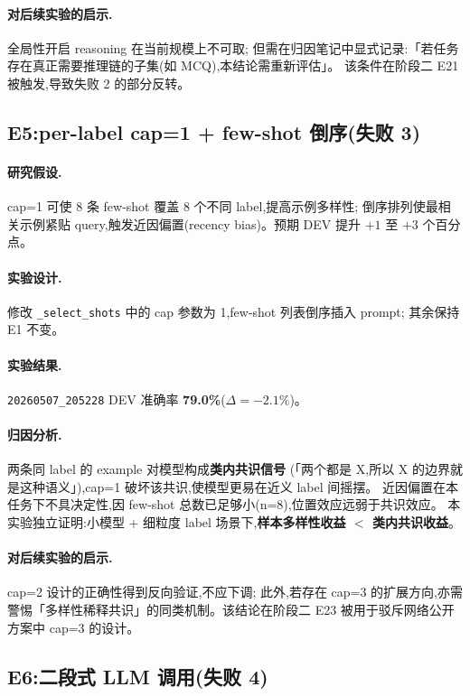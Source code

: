 \documentclass[11pt,a4paper]{ctexart}
\begin{document}
\paragraph{对后续实验的启示.}全局性开启 reasoning 在当前规模上不可取;
但需在归因笔记中显式记录:「若任务存在真正需要推理链的子集(如 MCQ),本结论需重新评估」。
该条件在阶段二 E21 被触发,导致失败 2 的部分反转。

\subsection{E5:per-label cap=1 + few-shot 倒序(失败 3)}

\paragraph{研究假设.}cap=1 可使 8 条 few-shot 覆盖 8 个不同 label,提高示例多样性;
倒序排列使最相关示例紧贴 query,触发近因偏置(recency bias)。预期 DEV 提升 $+1$ 至 $+3$ 个百分点。

\paragraph{实验设计.}修改 \texttt{\_select\_shots} 中的 cap 参数为 1,few-shot 列表倒序插入 prompt;
其余保持 E1 不变。

\paragraph{实验结果.}\texttt{20260507\_205228} DEV 准确率 \textbf{79.0\%}($\Delta = -2.1\%$)。

\paragraph{归因分析.}两条同 label 的 example 对模型构成\textbf{类内共识信号}
(「两个都是 X,所以 X 的边界就是这种语义」),cap=1 破坏该共识,使模型更易在近义 label 间摇摆。
近因偏置在本任务下不具决定性,因 few-shot 总数已足够小(n=8),位置效应远弱于共识效应。
本实验独立证明:小模型 + 细粒度 label 场景下,\textbf{样本多样性收益 $<$ 类内共识收益}。

\paragraph{对后续实验的启示.}cap=2 设计的正确性得到反向验证,不应下调;
此外,若存在 cap=3 的扩展方向,亦需警惕「多样性稀释共识」的同类机制。该结论在阶段二 E23 被用于驳斥网络公开方案中 cap=3 的设计。

\subsection{E6:二段式 LLM 调用(失败 4)}
\end{document}
